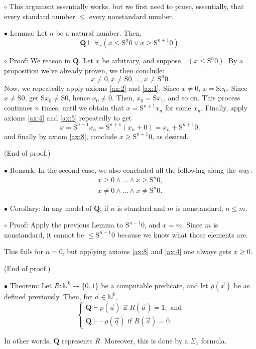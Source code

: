 \documentclass{article}
\newcommand{\N}{\mathbb{N}}
\newcommand{\RQ}{\mathbf{Q}}
\newcommand{\suc}{\mathrm{S}}
\newcommand\Point[1]{\noindent \hspace{\labelsep} {\large $\bullet$ #1} \smallskip}
\newcommand\point[1]{\noindent \hspace{\labelsep} {\small $\circ$ #1} \smallskip}
\newcommand\proofend{\hfill(End of proof.)}
\begin{document}
\point{This argument essentially works, but we first need to prove, essentially, that every standard number $\leq$ every nonstandard number.}

\Point{Lemma: Let $n$ be a natural number. Then,
\begin{equation}
\RQ \vdash \forall_x (x \leq \suc^n 0 \lor x \geq \suc^{n+1} 0).
\end{equation}}

\point{Proof: We reason in $\RQ$. Let $x$ be arbitrary, and suppose $\neg(x \leq \suc^n 0)$. By a proposition we've already proven, we then conclude:
\begin{equation}
x \neq 0, x \neq \suc 0, \dots, x \neq \suc^n 0.
\end{equation}
Now, we repeatedly apply axioms \ref{ax:2} and \ref{ax:1}. Since $x \neq 0$, $x = \suc x_0$. Since $x \neq \suc 0$, get $\suc x_0 \neq \suc 0$, hence $x_0 \neq 0$. Then, $x_0 = \suc x_1$, and so on. This process continues $n$ times, until we obtain that $x = \suc^{n+1} x_n$ for some $x_n$. Finally, apply axioms \ref{ax:4} and \ref{ax:5} repeatedly to get
\begin{equation}
x = \suc^{n+1}x_n = \suc^{n+1}(x_n + 0) = x_n + \suc^{n+1}0,
\end{equation}
and finally by axiom \ref{ax:8}, conclude $x \geq \suc^{n+1}0$, as desired.

\proofend
}

\Point{Remark: In the second case, we also concluded all the following along the way:
\begin{equation}
\begin{gathered}
x \geq 0 \land \dots \land x \geq \suc^n 0,\\
x \neq 0 \land \dots \land x \neq \suc^n 0.
\end{gathered}
\end{equation}}

\Point{Corollary: In any model of $\RQ$, if $n$ is standard and $m$ is nonstandard, $n \leq m$.}

\point{Proof: Apply the previous Lemma to $\suc^{n-1} 0$, and $x = m$. Since $m$ is nonstandard, it cannot be $\leq \suc^{n-1} 0$ because we know what those elements are.

This fails for $n = 0$, but applying axioms \ref{ax:8} and \ref{ax:4} one always gets $x \geq 0$.

\proofend}

\Point{Theorem: Let $R \colon \N^k \to \{0,1\}$ be a computable predicate, and let $\rho(\vec x)$ be as defined previously. Then, for $\vec a \in \N^k$,
\begin{equation}
\begin{cases}
\RQ \vdash \rho(\underline{\vec a}) \text{ if } R(\vec a) = 1, \text{ and}\\
\RQ \vdash \neg\rho(\underline{\vec a}) \text{ if } R(\vec a) = 0.
\end{cases}
\end{equation}

In other words, $\RQ$ represents $R$. Moreover, this is done by a $\Sigma_1$ formula.}
\end{document}
